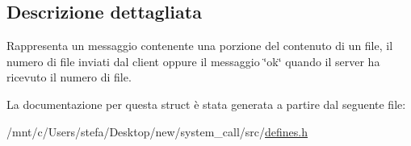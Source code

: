 \subsection{Descrizione dettagliata}
Rappresenta un messaggio contenente una porzione del contenuto di un file, il numero di file inviati dal client oppure il messaggio \char`\"{}ok\char`\"{} quando il server ha ricevuto il numero di file. 

La documentazione per questa struct è stata generata a partire dal seguente file\+:\begin{DoxyCompactItemize}
\item 
/mnt/c/\+Users/stefa/\+Desktop/new/system\+\_\+call/src/\hyperlink{defines_8h}{defines.\+h}\end{DoxyCompactItemize}
